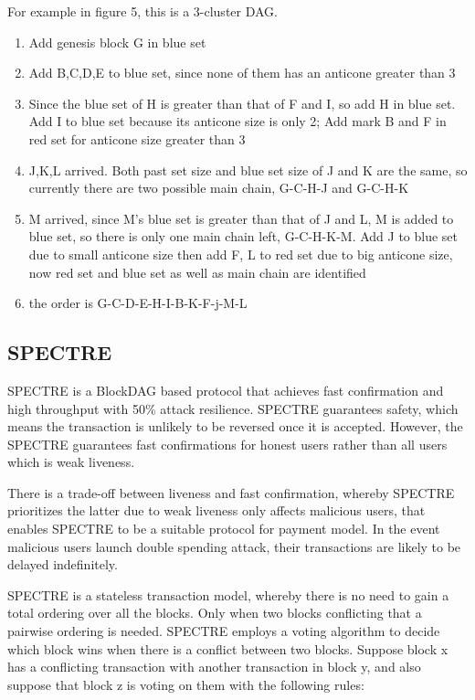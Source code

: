 \documentclass[a4paper,11pt]{article}
\begin{document}
For example in figure 5, this is a 3-cluster DAG. 

\begin{enumerate}
	\item Add genesis block G in blue set
	\item Add B,C,D,E to blue set, since none of them has an anticone greater than 3
	\item Since the blue set of H is greater than that of F and I, so add H in blue set. Add I to blue set because its anticone size is only 2; Add mark B and F in red set for anticone size greater than 3
	\item J,K,L arrived. Both past set size and blue set size of J and K are the same, so currently there are two possible main chain, G-C-H-J and G-C-H-K 
	\item M arrived, since M's blue set is greater than that of J and L, M is added to blue set, so there is only one main chain left, G-C-H-K-M. Add J to blue set due to small anticone size then add F, L to red set due to big anticone size, now red set and blue set as well as main chain are identified
	\item the order is G-C-D-E-H-I-B-K-F-j-M-L
\end{enumerate}

\subsection{SPECTRE}
SPECTRE\cite{SPECTRE} is a BlockDAG based protocol that achieves fast confirmation and high throughput with 50\% attack resilience. SPECTRE guarantees safety, which means the transaction is unlikely to be reversed once it is accepted. However, the SPECTRE guarantees fast confirmations for honest users rather than all users which is weak liveness.

There is a trade-off between liveness and fast confirmation, whereby SPECTRE prioritizes the latter due to weak liveness only affects malicious users, that enables SPECTRE to be a suitable protocol for payment model. In the event malicious users launch double spending attack, their transactions are likely to be delayed indefinitely.

SPECTRE is a stateless transaction model, whereby there is no need to gain a total ordering over all the blocks. Only when two blocks conflicting that a pairwise ordering is needed. SPECTRE employs a voting algorithm to decide which block wins when there is a conflict between two blocks. Suppose block x has a conflicting transaction with another transaction in block y, and also suppose that block z is voting on them with the following rules:
\end{document}
